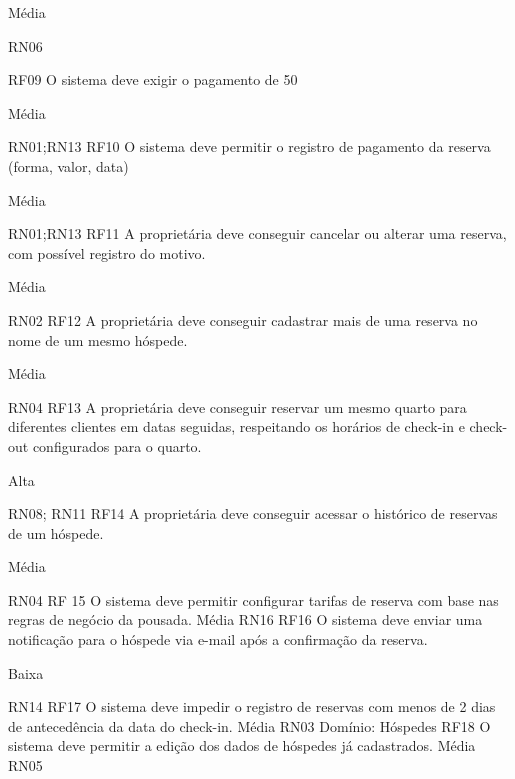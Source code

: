 Média








RN06





RF09
O sistema deve exigir o pagamento de 50%






Média






RN01;RN13
RF10
O sistema deve permitir o registro de pagamento da reserva (forma, valor, data)


Média


RN01;RN13 
RF11
A proprietária deve conseguir cancelar ou alterar uma reserva, com possível registro do motivo.




Média




RN02 
RF12
A proprietária deve conseguir cadastrar mais de uma reserva no nome de um mesmo hóspede.




Média




RN04 
RF13
A proprietária deve conseguir reservar um mesmo quarto para diferentes clientes em datas seguidas, respeitando os horários de check-in e check-out configurados para o quarto.








Alta








RN08; RN11
RF14
A proprietária deve conseguir acessar o histórico de reservas de um hóspede.


Média


RN04
RF 15
O sistema deve permitir configurar tarifas de reserva com base nas regras de negócio da pousada.
Média
RN16
RF16
O sistema deve enviar uma notificação para o hóspede via e-mail após a confirmação da reserva.




Baixa


RN14
RF17
O sistema deve impedir o registro de reservas com menos de 2 dias de antecedência da data do check-in.
Média
RN03
Domínio: Hóspedes
RF18
O sistema deve permitir  a edição dos dados de hóspedes já cadastrados.
Média
RN05








